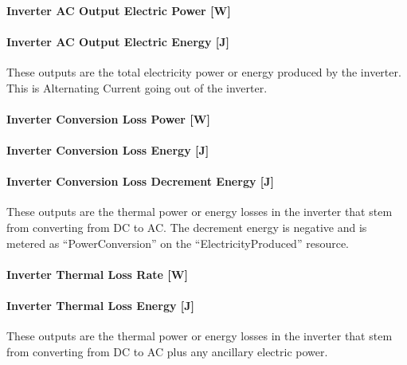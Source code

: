 \paragraph{Inverter AC Output Electric Power {[}W{]}}\label{inverter-ac-output-electric-power-w}

\paragraph{Inverter AC Output Electric Energy {[}J{]}}\label{inverter-ac-output-electric-energy-j}

These outputs are the total electricity power or energy produced by the inverter. This is Alternating Current going out of the inverter.

\paragraph{Inverter Conversion Loss Power {[}W{]}}\label{inverter-conversion-loss-power-w}

\paragraph{Inverter Conversion Loss Energy {[}J{]}}\label{inverter-conversion-loss-energy-j}

\paragraph{Inverter Conversion Loss Decrement Energy {[}J{]}}\label{inverter-conversion-loss-decrement-energy-j}

These outputs are the thermal power or energy losses in the inverter that stem from converting from DC to AC. The decrement energy is negative and is metered as ``PowerConversion'' on the ``ElectricityProduced'' resource.

\paragraph{Inverter Thermal Loss Rate {[}W{]}}\label{inverter-thermal-loss-rate-w}

\paragraph{Inverter Thermal Loss Energy {[}J{]}}\label{inverter-thermal-loss-energy-j}

These outputs are the thermal power or energy losses in the inverter that stem from converting from DC to AC plus any ancillary electric power.

